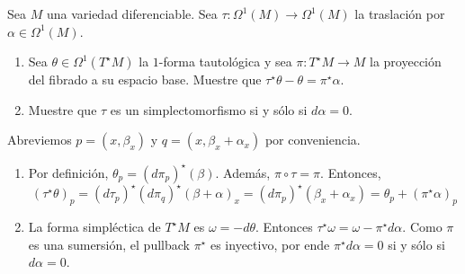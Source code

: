 \begin{problem}
Sea $M$ una variedad diferenciable. Sea $\tau : \Omega^1(M) \to \Omega^1(M)$ la traslación por $\alpha \in \Omega^1(M)$.

\begin{enumerate}
    \item Sea $\theta \in \Omega^1(T^\star M)$ la $1$-forma tautológica y sea $\pi : T^\star M \to M$ la proyección del fibrado a su espacio base. Muestre que $\tau^\star \theta - \theta = \pi^\star \alpha$.
    
    \item Muestre que $\tau$ es un simplectomorfismo si y sólo si $d\alpha = 0$.
\end{enumerate}
\end{problem}

\begin{solution}
Abreviemos $p = (x, \beta_x)$ y $q = (x, \beta_x + \alpha_x)$ por conveniencia.

\begin{enumerate}
    \item Por definición, $\theta_p = (d\pi_p)^\star (\beta)$. Además, $\pi \circ \tau = \pi$. Entonces,
    $$(\tau^\star \theta)_p = (d\tau_p)^\star (d\pi_q)^\star (\beta + \alpha)_x = (d\pi_p)^\star (\beta_x + \alpha_x) = \theta_p + (\pi^\star \alpha)_p$$
    
    \item La forma simpléctica de $T^\star M$ es $\omega = -d\theta$. Entonces $\tau^\star \omega = \omega - \pi^\star d\alpha$. Como $\pi$ es una sumersión, el pullback $\pi^\star$ es inyectivo, por ende $\pi^\star d\alpha = 0$ si y sólo si $d\alpha = 0$.
\end{enumerate}
\end{solution}
